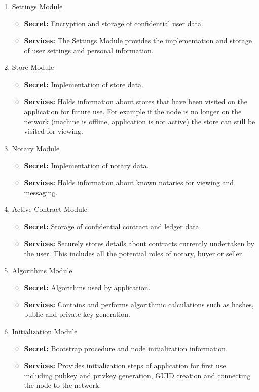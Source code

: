 \documentclass{article}
\begin{document}
\begin{enumerate}
\item
Settings Module
\begin{itemize}
\item
\textbf{Secret:} Encryption and storage of confidential user data.

\item
\textbf{Services:} The Settings Module provides the implementation and storage of user settings and personal information.
\end{itemize}

\item
Store Module
\begin{itemize}
\item
\textbf{Secret:} Implementation of store data.

\item
\textbf{Services:} Holds information about stores that have been visited on the application for future use. For example if the node is no longer on the network (machine is offline, application is not active) the store can still be visited for viewing.
\end{itemize}

\item
Notary Module
\begin{itemize}
\item
\textbf{Secret:} Implementation of notary data.

\item
\textbf{Services:} Holds information about known notaries for viewing and messaging.
\end{itemize}

\item
Active Contract Module
\begin{itemize}
\item
\textbf{Secret:} Storage of confidential contract and ledger data.

\item
\textbf{Services:} Securely stores details about contracts currently undertaken by the user. This includes all the potential roles of notary, buyer or seller.
\end{itemize}

\item
Algorithms Module
\begin{itemize}
\item
\textbf{Secret:} Algorithms used by application.

\item
\textbf{Services:} Contains and performs algorithmic calculations such as hashes, public and private key generation.
\end{itemize}

\item
Initialization Module
\begin{itemize}
\item
\textbf{Secret:} Bootstrap procedure and node initialization information.

\item
\textbf{Services:} Provides initialization steps of application for first use including pubkey and privkey generation, GUID creation and connecting the node to the network.
\end{itemize}
\end{enumerate}
\end{document}
